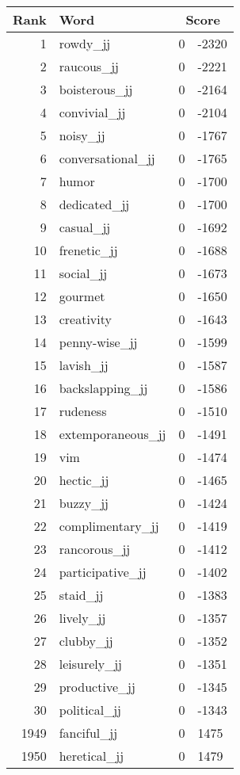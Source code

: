 \begin{longtable}[!htbp]{| rlr@{.}l |}
    \hline
    \textbf{Rank} & \textbf{Word} & \multicolumn{2}{c|}{\textbf{Score}} \\
    \hline
    \endhead
    1 & rowdy\_jj & 0 & -2320 \\
    2 & raucous\_jj & 0 & -2221 \\
    3 & boisterous\_jj & 0 & -2164 \\
    4 & convivial\_jj & 0 & -2104 \\
    5 & noisy\_jj & 0 & -1767 \\
    6 & conversational\_jj & 0 & -1765 \\
    7 & humor & 0 & -1700 \\
    8 & dedicated\_jj & 0 & -1700 \\
    9 & casual\_jj & 0 & -1692 \\
    10 & frenetic\_jj & 0 & -1688 \\
    11 & social\_jj & 0 & -1673 \\
    12 & gourmet & 0 & -1650 \\
    13 & creativity & 0 & -1643 \\
    14 & penny-wise\_jj & 0 & -1599 \\
    15 & lavish\_jj & 0 & -1587 \\
    16 & backslapping\_jj & 0 & -1586 \\
    17 & rudeness & 0 & -1510 \\
    18 & extemporaneous\_jj & 0 & -1491 \\
    19 & vim & 0 & -1474 \\
    20 & hectic\_jj & 0 & -1465 \\
    21 & buzzy\_jj & 0 & -1424 \\
    22 & complimentary\_jj & 0 & -1419 \\
    23 & rancorous\_jj & 0 & -1412 \\
    24 & participative\_jj & 0 & -1402 \\
    25 & staid\_jj & 0 & -1383 \\
    26 & lively\_jj & 0 & -1357 \\
    27 & clubby\_jj & 0 & -1352 \\
    28 & leisurely\_jj & 0 & -1351 \\
    29 & productive\_jj & 0 & -1345 \\
    30 & political\_jj & 0 & -1343 \\
    1949 & fanciful\_jj & 0 & 1475 \\
    1950 & heretical\_jj & 0 & 1479 \\

\end{longtable}
